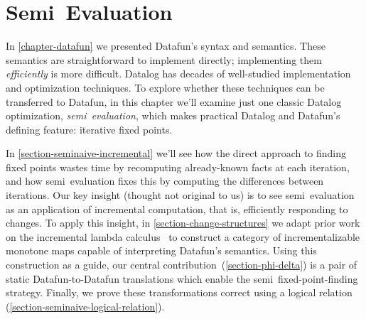 \chapter{Semi\naive\ Evaluation}
\label{chapter-seminaive}


\noindent
In \cref{chapter-datafun} we presented Datafun's syntax and semantics. These semantics are straightforward to implement directly; implementing them \emph{efficiently} is more difficult. Datalog has decades of well-studied implementation and optimization techniques.
%
To explore whether these techniques can be transferred to Datafun, in this
chapter we'll examine just one classic Datalog optimization,
\emph{semi\naive\ evaluation}, which makes practical Datalog and Datafun's
defining feature: iterative fixed points.

In \cref{section-seminaive-incremental} we'll see how the direct approach to finding fixed points wastes time by recomputing already-known facts at each iteration, and how semi\naive\ evaluation fixes this by computing the differences between iterations. Our key insight (thought not original to us) is to see semi\naive\ evaluation as an application of incremental computation, that is, efficiently responding to changes.
%
To apply this insight, in \cref{section-change-structures} we adapt prior work on the incremental lambda calculus~\citep{incremental} to construct a category of incrementalizable monotone maps capable of interpreting Datafun's semantics.
%
Using this construction as a guide, our central contribution~(\cref{section-phi-delta}) is a pair of static Datafun-to-Datafun translations which enable the semi\naive\ fixed-point-finding strategy. Finally, we prove these transformations correct using a logical relation  (\cref{section-seminaive-logical-relation}).








